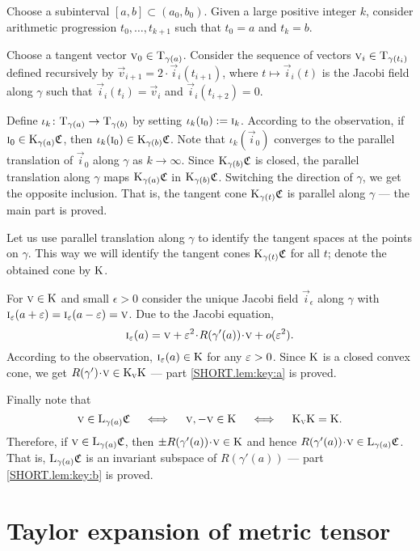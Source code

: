 \documentclass[a4paper,10pt]{article}
\begin{document}
Choose a subinterval $[a,b] \subset (a_0,b_0)$.
Given a large positive integer $k$, consider arithmetic progression
$t_0,\dots,t_{k+1}$ such that $t_0=a$ and $t_k=b$.

Choose a tangent vector $\text{\sc{v}}_0\in\mathrm{T}_{\gamma(a)}$.
Consider the sequence of vectors $\vec{v}_i\z\in\T_{\gamma(t_i)}$ defined recursively by $\vec{v}_{i+1}=2\cdot \vec{i}_i(t_{i+1})$, where $t\mapsto \vec{i}_i(t)$ is the Jacobi field along $\gamma$ such that $\vec{i}_i(t_i)=\vec{v}_i$ and $\vec{i}_i(t_{i+2})=0$.

Define $\iota_k\colon\mathrm{T}_{\gamma(a)}\to \mathrm{T}_{\gamma(b)}$ by setting $\iota_k(\text{\sc{i}}_0)\mathrel{{:}{=}} \text{\sc{i}}_k$.
According to the observation, if $\text{\sc{i}}_0\in \mathrm{K}_{\gamma(a)}\mathfrak{C}$, then $\iota_k(\text{\sc{i}}_0)\in \mathrm{K}_{\gamma(b)}\mathfrak{C}$.
Note that $\iota_k(\vec{i}_0)$ converges to the parallel translation of $\vec{i}_0$ along $\gamma$ as $k\to \infty$.
Since $\mathrm{K}_{\gamma(b)}\mathfrak{C}$ is closed,
the parallel translation along $\gamma$ maps $\mathrm{K}_{\gamma(a)}\mathfrak{C}$ in $\mathrm{K}_{\gamma(b)}\mathfrak{C}$.
Switching the direction of $\gamma$, we get the opposite inclusion.
That is, the tangent cone $\mathrm{K}_{\gamma(t)}\mathfrak{C}$ is parallel along $\gamma$ --- the main part is proved.

Let us use parallel translation along $\gamma$ to identify the tangent spaces at the points on $\gamma$.
This way we will identify the tangent cones $\mathrm{K}_{\gamma(t)}\mathfrak{C}$ for all $t$;
denote the obtained cone by $\mathrm{K}$.

For $\text{\sc{v}}\in \mathrm{K}$ and small $\epsilon>0$ consider the unique Jacobi field $\vec{i}_\epsilon$ along $\gamma$ with $\vec{i}_\epsilon (a+\eps)\z=\vec{i} _\epsilon(a-\eps)=\vec{v}$.
Due to the Jacobi equation,
\[\vec{i}_\epsilon (a)=\vec{v} +\eps^2\cdot R(\gamma'(a))\cdot \vec{v} +o(\eps^2).\]
According to the observation, $\text{\sc{i}}_\varepsilon(a)\in \mathrm{K}$ for any $\varepsilon>0$.
Since $\mathrm{K}$ is a closed convex cone, we get $R(\gamma')\cdot \vec{v}\z\in \K_\vec{v}\K$ --- part \ref{SHORT.lem:key:a} is proved.

Finally note that 
\[\text{\sc{v}}\in \mathrm{L}_{\gamma(a)}\mathfrak{C}
\quad\iff\quad 
\text{\sc{v}}, -\text{\sc{v}}\in \mathrm{K}
\quad\iff\quad 
\mathrm{K}_{\text{\sc{v}}}\mathrm{K}=\mathrm{K}.
\]
Therefore, if $\text{\sc{v}}\in \mathrm{L}_{\gamma(a)}\mathfrak{C}$, then $\pm R(\gamma'(a))\cdot \vec{v}\in \K$ and hence $R(\gamma'(a))\cdot \vec{v}\in \L_{\gamma(a)}\mathfrak{C}$.
That is, $\mathrm{L}_{\gamma(a)}\mathfrak{C}$ is an invariant subspace of $R(\gamma'(a))$ --- part \ref{SHORT.lem:key:b} is proved.
\qeds

\section{Taylor expansion of metric tensor}\label{sec:jet}
\end{document}
